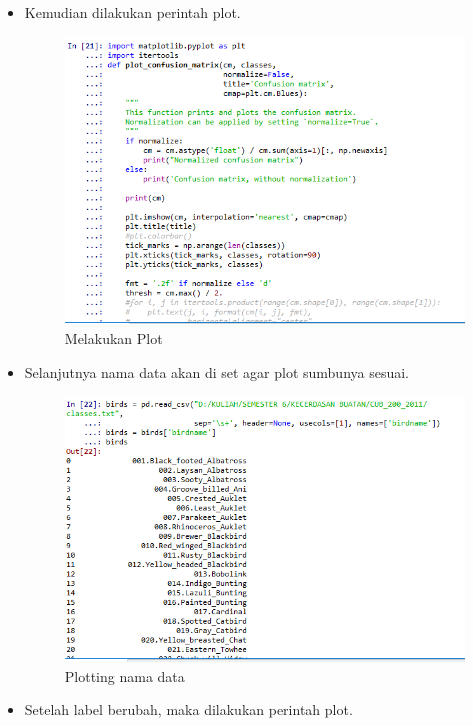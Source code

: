 \begin{enumerate}
\begin{itemize}
\begin{figure}[!hbtp]
			\end{figure}
		\item Kemudian dilakukan perintah plot.
			\begin{figure}[!hbtp]
			\centering
			\includegraphics[scale=0.5]{figures/AIP/ai27.PNG}
			\caption{Melakukan Plot}
			\label{contoh}
			\end{figure}
		\item Selanjutnya nama data akan di set agar plot sumbunya sesuai.
			\begin{figure}[!hbtp]
			\centering
			\includegraphics[scale=0.5]{figures/AIP/ai28.PNG}
			\caption{Plotting nama data}
			\label{contoh}
			\end{figure}
		\item Setelah label berubah, maka dilakukan perintah plot.
		\begin{figure}[!hbtp]

\end{figure}
\end{itemize}
\end{enumerate}
